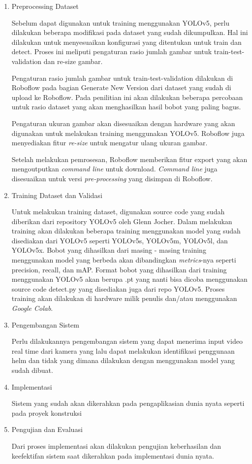 \begin{enumerate}
  \item Preprocessing Dataset
  \par Sebelum dapat digunakan untuk training menggunakan YOLOv5, perlu dilakukan beberapa modifikasi pada dataset yang sudah dikumpulkan. Hal ini dilakukan untuk menyesuaikan konfigurasi 
  yang ditentukan untuk train dan detect. Proses ini meliputi pengaturan rasio jumlah gambar untuk train-test-validation dan re-size gambar.
  \par Pengaturan rasio jumlah gambar untuk train-test-validation dilakukan di Roboflow pada bagian Generate New Version dari dataset yang sudah di upload ke Roboflow. Pada penilitian ini akan dilakukan beberapa percobaan untuk rasio dataset yang akan menghasilkan hasil bobot yang paling bagus.
  \par Pengaturan ukuran gambar akan disesuaikan dengan hardware yang akan digunakan untuk melakukan training menggunakan YOLOv5. Roboflow juga menyediakan fitur \emph{re-size} untuk mengatur ulang
  ukuran gambar.
  \par Setelah melakukan pemrosesan, Roboflow memberikan fitur export yang akan mengoutputkan \emph{command line} untuk download. \emph{Command line} juga disesuaikan untuk versi \emph{pre-processing} yang disimpan
  di Roboflow.

  \item Training Dataset dan Validasi
  \par Untuk melakukan training dataset, digunakan source code yang sudah diberikan dari repository YOLOv5 oleh Glenn Jocher. Dalam melakukan training akan dilakukan beberapa training menggunakan model yang sudah disediakan
  dari YOLOv5 seperti YOLOv5s, YOLOv5m, YOLOv5l, dan YOLOv5x. Bobot yang dihasilkan dari masing - masing training menggunakan model yang berbeda akan dibandingkan \emph{metrics}-nya seperti precision, recall, dan mAP. Format bobot yang dihasilkan
  dari training menggunakan YOLOv5 akan berupa .pt yang nanti bisa dicoba menggunakan source code detect.py yang disediakan juga dari repo YOLOv5.
  Proses training akan dilakukan di hardware milik penulis dan/atau menggunakan \emph{Google Colab}.

  \item Pengembangan Sistem
  \par Perlu dilakukannya pengembangan sistem yang dapat menerima input video real time dari kamera yang lalu dapat melakukan identifikasi penggunaan helm dan tidak yang dimana dilakukan dengan menggunakan model yang sudah dibuat.

  \item Implementasi
  \par Sistem yang sudah akan dikerahkan pada pengaplikasian dunia nyata seperti pada proyek konstruksi

  \item Pengujian dan Evaluasi
  \par Dari proses implementasi akan dilakukan pengujian keberhasilan dan keefektifan sistem saat dikerahkan pada implementasi dunia nyata.

\end{enumerate}


